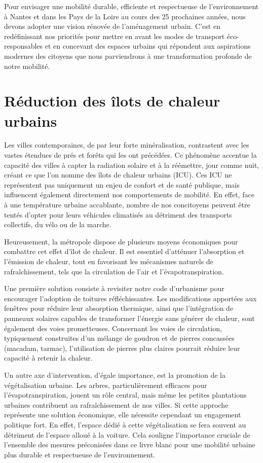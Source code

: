 Pour envisager une mobilité durable, efficiente et respectueuse de
l'environnement à Nantes et dans les Pays de la Loire au cours des 25
prochaines années, nous devons adopter une vision rénovée de
l'aménagement urbain. C'est en redéfinissant nos priorités pour mettre
en avant les modes de transport éco-responsables et en concevant des
espaces urbains qui répondent aux aspirations modernes des citoyens
que nous parviendrons à une transformation profonde de notre mobilité.


\section{Réduction des îlots de chaleur urbains}

Les villes contemporaines, de par leur forte minéralisation,
contrastent avec les vastes étendues de prés et forêts qui les ont
précédées. Ce phénomène accentue la capacité des villes à capter la
radiation solaire et à la réémettre, jour comme nuit, créant ce que
l'on nomme des îlots de chaleur urbains (ICU). Ces ICU ne représentent
pas uniquement un enjeu de confort et de santé publique, mais
influencent également directement nos comportements de mobilité. En
effet, face à une température urbaine accablante, nombre de nos
concitoyens peuvent être tentés d'opter pour leurs véhicules
climatisés au détriment des transports collectifs, du vélo ou de la
marche.

Heureusement, la métropole dispose de plusieurs moyens économiques
pour combattre cet effet d'îlot de chaleur. Il est essentiel
d'atténuer l'absorption et l'émission de chaleur, tout en favorisant
les mécanismes naturels de rafraîchissement, tels que la circulation
de l'air et l'évapotranspiration.

Une première solution consiste à revisiter notre code d'urbanisme pour
encourager l'adoption de toitures réfléchissantes. Les modifications
apportées aux fenêtres pour réduire leur absorption thermique, ainsi
que l'intégration de panneaux solaires capables de transformer
l'énergie sans générer de chaleur, sont également des voies
prometteuses. Concernant les voies de circulation, typiquement
construites d'un mélange de goudron et de pierres concassées (macadam,
tarmac), l'utilisation de pierres plus claires pourrait réduire leur
capacité à retenir la chaleur.

Un autre axe d'intervention, d'égale importance, est la promotion de
la végétalisation urbaine. Les arbres, particulièrement efficaces pour
l'évapotranspiration, jouent un rôle central, mais même les petites
plantations urbaines contribuent au rafraîchissement de nos villes. Si
cette approche représente une solution économique, elle nécessite
cependant un engagement politique fort. En effet, l'espace dédié à
cette végétalisation se fera souvent au détriment de l'espace alloué à
la voiture. Cela souligne l'importance cruciale de l'ensemble des
mesures préconisées dans ce livre blanc pour une mobilité urbaine plus
durable et respectueuse de l'environnement.